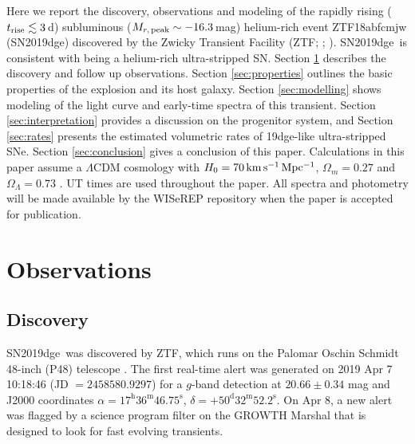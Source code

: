 \documentclass[twocolumn]{aastex63}
\newcommand{\name}{SN2019dge}
\begin{document}
\begin{CJK*}{UTF8}{gbsn}
Here we report the discovery, observations and modeling of the rapidly rising ($t_{\rm rise}\lesssim 
3$\,d) subluminous ($M_{r\rm ,\, peak} \sim -16.3$\,mag) helium-rich event ZTF18abfcmjw (SN2019dge) 
discovered by the Zwicky Transient Facility (ZTF; \citealt{Bellm2019b};  \citealt{Graham2019}). \name\ 
is consistent with being a helium-rich ultra-stripped SN. Section \ref{sec:obs} describes 
the discovery and follow up observations. Section 
\ref{sec:properties} outlines the basic properties of the explosion and its host galaxy. Section 
\ref{sec:modelling} shows modeling of the light curve and early-time spectra of this transient. Section 
\ref{sec:interpretation} provides a discussion on the progenitor system, and Section \ref{sec:rates} 
presents the estimated volumetric rates of 19dge-like ultra-stripped SNe. Section \ref{sec:conclusion} 
gives a conclusion of this paper. Calculations in this paper assume a $\Lambda$CDM 
cosmology with $H_0= 70 \, \rm km \, s^{-1}\, 
Mpc^{-1}$, $\Omega_m = 0.27$ and $\Omega_{\Lambda} = 0.73$ \citep{Komatsu2011}. UT times are 
used throughout the paper. 
All spectra and photometry will be made available by the WISeREP repository \citep{Yaron2012} when 
the paper is accepted  for publication.

\section{Observations}  \label{sec:obs}
\subsection{Discovery}

\name\ was discovered by ZTF, which runs on the Palomar Oschin Schmidt 48-inch (P48) 
telescope \citep{Dekany2020}. The first real-time alert \citep{Patterson2019} was generated on 2019 
Apr 7 10:18:46 (JD 
$=2458580.9297$) for a $g$-band detection at $20.66\pm0.34$ mag and J2000 coordinates $\alpha 
= 17^{\mathrm{h}}36^{\mathrm{m}}46.75^{\mathrm{s}}$, $\delta = 
+50^{\mathrm{d}}32^{\mathrm{m}}52.2^{\mathrm{s}}$.
On Apr 8, a new alert was flagged by a science program filter on the 
GROWTH Marshal \citep{Kasliwal2019} that is designed to look for fast evolving transients. 


\end{CJK*}
\end{document}
